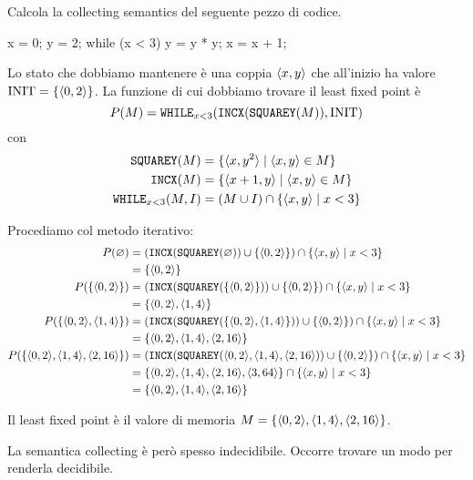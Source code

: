 \begin{example}\label{example:collecting}
Calcola la collecting semantics del seguente pezzo di codice.
\begin{javascriptcode}
x = 0;
y = 2;
while (x < 3) {
    y = y * y;
    x = x + 1;
}
\end{javascriptcode}
Lo stato che dobbiamo mantenere è una coppia $\langle x,y \rangle$ che all'inizio ha valore $\mathrm{INIT} = \{ \langle 0, 2 \rangle \}$. La funzione di cui dobbiamo trovare il least fixed point è
\[ P(M) = \texttt{WHILE}_{x<3}(\texttt{INCX}(\texttt{SQUAREY}(M)), \mathrm{INIT}) \]
con 
\begin{align*}
    \texttt{SQUAREY}(M) &= \{ \langle x,y^2 \rangle \mid \langle x,y \rangle \in M \} \\
    \texttt{INCX}(M) &= \{ \langle x+1,y \rangle \mid \langle x,y \rangle \in M \} \\
    \texttt{WHILE}_{x<3}(M, I) &= (M \cup I) \cap \{ \langle x,y \rangle \mid x < 3 \} 
\end{align*}

Procediamo col metodo iterativo:
\begin{align*}
    P(\varnothing) 
        &= (\texttt{INCX}(\texttt{SQUAREY}(\varnothing)) 
        \cup \{ \langle 0, 2 \rangle \} ) 
        \cap \{ \langle x,y \rangle \mid x < 3 \} \\
        &= \{ \langle 0, 2 \rangle \} \\
    P(\{ \langle 0, 2 \rangle \}) 
        &= (\texttt{INCX}(\texttt{SQUAREY}(\{ \langle 0, 2 \rangle \})) 
        \cup \{ \langle 0, 2 \rangle \} ) 
        \cap \{ \langle x,y \rangle \mid x < 3 \} \\
        &= \{ \langle 0, 2 \rangle,  \langle 1, 4 \rangle \} \\
    P(\{ \langle 0, 2 \rangle,  \langle 1, 4 \rangle \}) 
        &= (\texttt{INCX}(\texttt{SQUAREY}(\{ \langle 0, 2 \rangle,  \langle 1, 4 \rangle \})) 
        \cup \{ \langle 0, 2 \rangle \} ) 
        \cap \{ \langle x,y \rangle \mid x < 3 \} \\
        &= \{ \langle 0, 2 \rangle,  \langle 1, 4 \rangle, \langle 2, 16 \rangle \} \\
    P(\{ \langle 0, 2 \rangle,  \langle 1, 4 \rangle, \langle 2, 16 \rangle \} ) 
        &= (\texttt{INCX}(\texttt{SQUAREY}(\langle 0, 2 \rangle,  \langle 1, 4 \rangle, \langle 2, 16 \rangle)) 
        \cup \{ \langle 0, 2 \rangle \} ) 
        \cap \{ \langle x,y \rangle \mid x < 3 \} \\
        &= \{ \langle 0, 2 \rangle,  \langle 1, 4 \rangle, \langle 2, 16 \rangle, \langle 3, 64 \rangle \}
        \cap \{ \langle x,y \rangle \mid x < 3 \} \\
        &= \{ \langle 0, 2 \rangle,  \langle 1, 4 \rangle, \langle 2, 16 \rangle \}
\end{align*}

Il least fixed point è il valore di memoria $M = \{ \langle 0, 2 \rangle,  \langle 1, 4 \rangle, \langle 2, 16 \rangle \}$.
\end{example}

La semantica collecting è però spesso indecidibile. Occorre trovare un modo per renderla decidibile. 
